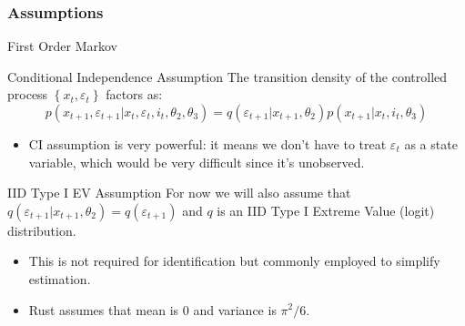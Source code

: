 \documentclass[xcolor=pdftex,dvipsnames,table,mathserif,aspectratio=169]{beamer}
\begin{document}
\begin{frame}
\frametitle{Assumptions}
\begin{block}{First Order Markov}\end{block}\vspace{-0.5cm}
\begin{block}{Conditional Independence Assumption}
The transition density of the controlled process $\left\{x_{t},\varepsilon_{t}\right\}$ factors as:\[
p\left(x_{t+1},\varepsilon_{t+1}|x_{t},\varepsilon_{t},i_{t},\theta_{2},\theta_{3}\right)
= q\left(\varepsilon_{t+1}|x_{t+1},\theta_{2}\right)p\left(x_{t+1}|x_{t},i_{t},\theta_{3}\right)
\]
\end{block}

\begin{itemize}
	\item CI assumption is very powerful: it means we don't have to treat $\varepsilon_{t}$ as
	a state variable, which would be very difficult since it's unobserved.
\end{itemize}
\begin{block}{IID Type I EV Assumption}
For now we will also assume that $ q\left(\varepsilon_{t+1}|x_{t+1},\theta_{2}\right) =  q\left(\varepsilon_{t+1}\right)$ and $q$ is an IID Type I Extreme Value (logit) distribution.
\end{block}
\begin{itemize}
\item This is not required for identification but commonly employed to simplify estimation.
\item Rust assumes that mean is $0$ and variance is $\pi^2/6$.
\end{itemize}
\end{frame}
\end{document}
